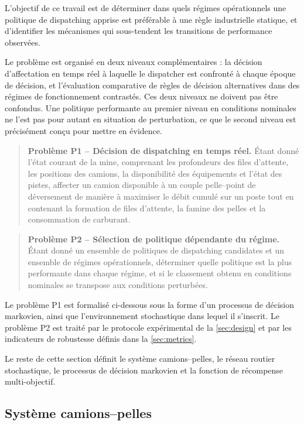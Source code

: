 \documentclass[11pt,a4paper]{article}
\begin{document}
L'objectif de ce travail est de déterminer dans quels régimes opérationnels une politique de dispatching apprise est préférable à une règle industrielle statique, et d'identifier les mécanismes qui sous-tendent les transitions de performance observées.

Le problème est organisé en deux niveaux complémentaires : la décision d'affectation en temps réel à laquelle le dispatcher est confronté à chaque époque de décision, et l'évaluation comparative de règles de décision alternatives dans des régimes de fonctionnement contrastés. Ces deux niveaux ne doivent pas être confondus. Une politique performante au premier niveau en conditions nominales ne l'est pas pour autant en situation de perturbation, ce que le second niveau est précisément conçu pour mettre en évidence.

\begin{quote}
\textbf{Problème P1 -- Décision de dispatching en temps réel.}
Étant donné l'état courant de la mine, comprenant les profondeurs des files d'attente, les positions des camions, la disponibilité des équipements et l'état des pistes, affecter un camion disponible à un couple pelle--point de déversement de manière à maximiser le débit cumulé sur un poste tout en contenant la formation de files d'attente, la famine des pelles et la consommation de carburant.
\end{quote}

\begin{quote}
\textbf{Problème P2 -- Sélection de politique dépendante du régime.}
Étant donné un ensemble de politiques de dispatching candidates et un ensemble de régimes opérationnels, déterminer quelle politique est la plus performante dans chaque régime, et si le classement obtenu en conditions nominales se transpose aux conditions perturbées.
\end{quote}

Le problème P1 est formalisé ci-dessous sous la forme d'un processus de décision markovien, ainsi que l'environnement stochastique dans lequel il s'inscrit. Le problème P2 est traité par le protocole expérimental de la \cref{sec:design} et par les indicateurs de robustesse définis dans la \cref{sec:metrics}.

Le reste de cette section définit le système camions--pelles, le réseau routier stochastique, le processus de décision markovien et la fonction de récompense multi-objectif.

\subsection{Système camions--pelles}
\end{document}
